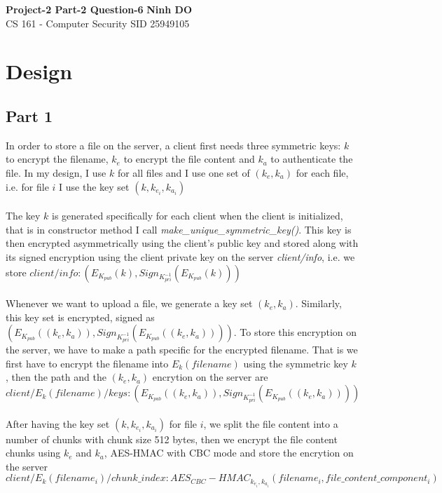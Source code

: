 \documentclass[a4paper, 11pt]{article}
\begin{document}
\noindent
\large\textbf{Project-2 Part-2 Question-6} \hfill \textbf{Ninh DO} \\
\normalsize CS 161 - Computer Security \hfill SID 25949105 \\

\section*{Design}
\subsection*{Part 1}
In order to store a file on the server, a client first needs three symmetric keys: $k$ to encrypt the filename, $k_e$ to encrypt the file content and $k_a$ to authenticate the file. In my design, I use $k$ for all files and I use one set of $(k_e, k_a)$ for each file, i.e. for file $i$ I use the key set $(k,k_{e_i},k_{a_i})$\\
\\
The key $k$ is generated specifically for each client when the client is initialized, that is in constructor method I call \textit{make\_unique\_symmetric\_key()}. This key is then encrypted asymmetrically using the client's public key and stored along with its signed encryption using the client private key on the server \textit{client/info}, i.e. we store $client/info : \left(E_{K_{pub}}(k), Sign_{K^{-1}_{pri}}(E_{K_{pub}}(k))\right)$\\
\\
Whenever we want to upload a file, we generate a key set $(k_e, k_a)$. Similarly, this key set is encrypted, signed as $\left(E_{K_{pub}}((k_e, k_a)), Sign_{K^{-1}_{pri}}(E_{K_{pub}}((k_e, k_a)))\right)$. To store this encryption on the server, we have to make a path specific for the encrypted filename. That is we first have to encrypt the filename into $E_k(filename)$ using the symmetric key $k$, then the path and the $(k_e, k_a)$ encrytion on the server are $client/E_k(filename)/keys : \left(E_{K_{pub}}((k_e, k_a)), Sign_{K^{-1}_{pri}}(E_{K_{pub}}((k_e, k_a)))\right)$\\
\\
After having the key set $(k,k_{e_i},k_{a_i})$ for file $i$, we split the file content into a number of chunks with chunk size 512 bytes, then we encrypt the file content chunks using $k_e$ and $k_a$, AES-HMAC with CBC mode and store the encrytion on the server $client/E_k(filename_i)/chunk\_index : AES_{CBC}-HMAC_{k_{e_i},k_{a_i}}(filename_i, file\_content\_component_i)$\\
\end{document}
